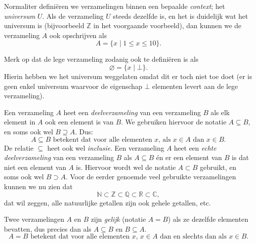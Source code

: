 Normaliter defini\"eren we verzamelingen binnen een bepaalde \textit{context}; het \textit{universum} $U$. Als de verzameling $U$ steeds dezelfde is, en het is duidelijk wat het universum is (bijvoorbeeld $\mathbb{Z}$ in het voorgaande voorbeeld), dan kunnen we de verzameling $A$ ook opschrijven als
$$A=\{x\;|\;1\leq x\leq 10\}.$$

Merk op dat de lege verzameling zodanig ook te defini\"eren is als
$$\varnothing=\{x\;|\;\bot\}.$$
Hierin hebben we het universum weggelaten omdat dit er toch niet toe doet (er is geen enkel universum waarvoor de eigenschap $\bot$ elementen levert aan de lege verzameling). 

Een verzameling $A$ heet een \textit{deelverzameling} van een verzameling $B$ als elk element in $A$ ook een element is van $B$. We gebruiken hiervoor de notatie $A\subseteq B$, en soms ook wel $B\supseteq A$. Dus:
$$A\subseteq B\text{ betekent dat voor alle elementen $x$, als $x\in A$ dan $x\in B$.}$$
De relatie $\subseteq$ heet ook wel \textit{inclusie}. Een verzameling $A$ heet een \textit{echte deelverzameling} van een verzameling $B$ als $A\subseteq B$ \'en er een element van $B$ is dat niet een element van $A$ is. Hiervoor wordt wel de notatie $A\subset B$ gebruikt, en soms ook wel $B\supset A$. Voor de eerder genoemde veel gebruikte verzamelingen kunnen we nu zien dat
$$\mathbb{N}\subset\mathbb{Z}\subset\mathbb{Q}\subset\mathbb{R}\subset\mathbb{C},$$
dat wil zeggen, alle natuurlijke getallen zijn ook gehele getallen, etc.

Twee verzamelingen $A$ en $B$ zijn \textit{gelijk} (notatie $A=B$) als ze dezelfde elementen bevatten, dus precies dan als $A\subseteq B$ en $B\subseteq A$.
$$A=B\text{ betekent dat voor alle elementen $x$, $x\in A$ dan en slechts dan als $x\in B$.}$$

